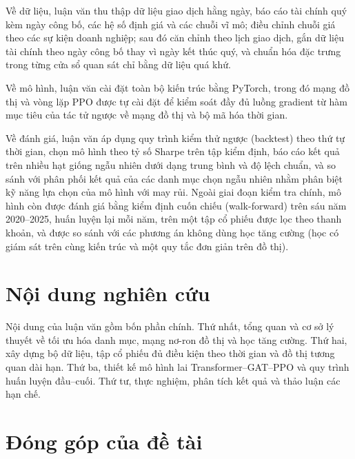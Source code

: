 Về dữ liệu, luận văn thu thập dữ liệu giao dịch hằng ngày, báo cáo tài chính quý kèm ngày công bố, các hệ số định giá và các chuỗi vĩ mô; điều chỉnh chuỗi giá theo các sự kiện doanh nghiệp; sau đó căn chỉnh theo lịch giao dịch, gắn dữ liệu tài chính theo ngày công bố thay vì ngày kết thúc quý, và chuẩn hóa đặc trưng trong từng cửa sổ quan sát chỉ bằng dữ liệu quá khứ.

Về mô hình, luận văn cài đặt toàn bộ kiến trúc bằng PyTorch, trong đó mạng đồ thị và vòng lặp PPO được tự cài đặt để kiểm soát đầy đủ luồng gradient từ hàm mục tiêu của tác tử ngược về mạng đồ thị và bộ mã hóa thời gian.

Về đánh giá, luận văn áp dụng quy trình kiểm thử ngược (backtest) theo thứ tự thời gian, chọn mô hình theo tỷ số Sharpe trên tập kiểm định, báo cáo kết quả trên nhiều hạt giống ngẫu nhiên dưới dạng trung bình và độ lệch chuẩn, và so sánh với phân phối kết quả của các danh mục chọn ngẫu nhiên nhằm phân biệt kỹ năng lựa chọn của mô hình với may rủi. Ngoài giai đoạn kiểm tra chính, mô hình còn được đánh giá bằng kiểm định cuốn chiếu (walk-forward) trên sáu năm 2020--2025, huấn luyện lại mỗi năm, trên một tập cổ phiếu được lọc theo thanh khoản, và được so sánh với các phương án không dùng học tăng cường (học có giám sát trên cùng kiến trúc và một quy tắc đơn giản trên đồ thị).

\section*{Nội dung nghiên cứu}

Nội dung của luận văn gồm bốn phần chính. Thứ nhất, tổng quan và cơ sở lý thuyết về tối ưu hóa danh mục, mạng nơ-ron đồ thị và học tăng cường. Thứ hai, xây dựng bộ dữ liệu, tập cổ phiếu đủ điều kiện theo thời gian và đồ thị tương quan dài hạn. Thứ ba, thiết kế mô hình lai Transformer--GAT--PPO và quy trình huấn luyện đầu--cuối. Thứ tư, thực nghiệm, phân tích kết quả và thảo luận các hạn chế.

\section*{Đóng góp của đề tài}

